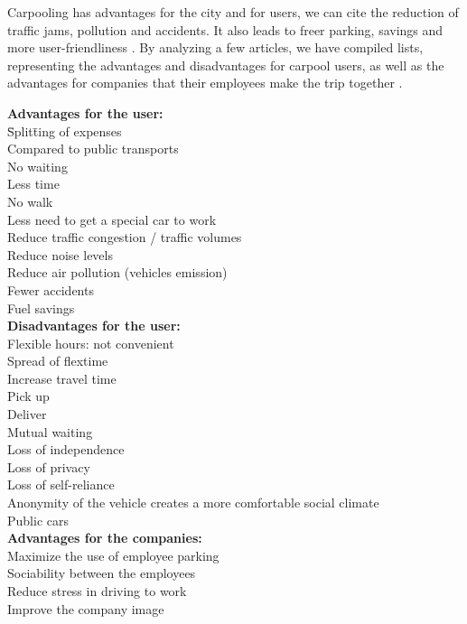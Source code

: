 \documentclass[12pt, a4paper,twoside]{memoir}
\newcommand{\newpar}{\vskip 0.2in \noindent}
\newcommand\tab[1][1cm]{\hspace*{#1}}
\begin{document}
	Carpooling has advantages for the city and for users, we can cite the reduction of traffic jams, pollution and accidents. It also leads to freer parking, savings and more user-friendliness \cite{berlingeriograal2017}.
	\newpar
	By analyzing a few articles, we have compiled lists, representing the advantages and disadvantages for carpool users, as well as the advantages for companies that their employees make the trip together \cite{huangmodels2000} \cite{onwubolunew2004} \cite{yanoptimization2011} \cite{bruglieripoliunipool:2011}.
	\begin{tabbing}
		{\bfseries Advantages for the user:}\\
		\tab \= Split\=ting of expenses \\
		\> Compared to public transports \> \\
		\> \> No waiting \\
		\> \> Less time \\
		\> \> No walk \\
		\> Less need to get a special car to work \> \\
		\> Reduce traffic congestion / traffic volumes \> \\
		\> Reduce noise levels \> \\
		\> Reduce air pollution (vehicles emission) \> \\
		\> Fewer accidents \> \\
		\> Fuel savings \> \\
		{\bfseries Disadvantages for the user:} \\
		\> Flexible hours: not convenient \\
		\> \> Spread of flextime \\
		\> Increase travel time \\
		\> \> Pick up \\
		\> \> Deliver \\
		\> \> Mutual waiting \\
		\> Loss of independence \\
		\> Loss of privacy \\
		\> Loss of self-reliance \\
		\> Anonymity of the vehicle creates a more comfortable social climate \\
		\> \> Public cars \\
		{\bfseries Advantages for the companies: }\\
		\> Maximize the use of employee parking \\
		\> Sociability between the employees \\
		\> Reduce stress in driving to work \\
		\> Improve the company image \\
	\end{tabbing}
	
\end{document}
